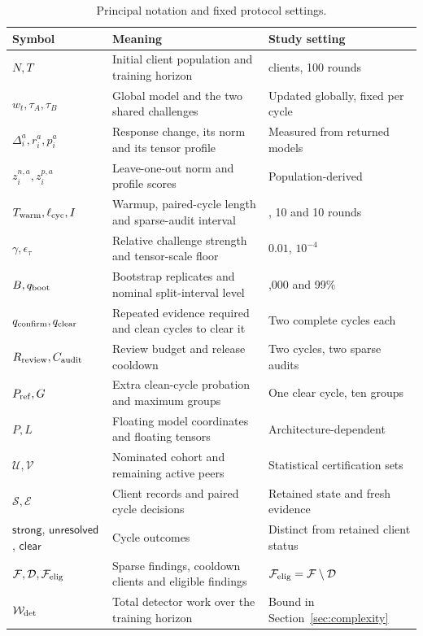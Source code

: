 \begin{table}[t]\centering\footnotesize
\renewcommand{\arraystretch}{1.05}
\caption{Principal notation and fixed protocol settings.}\label{tab:notation-settings}
\begin{tabular}{>{\raggedright\arraybackslash}p{3.1cm}>{\raggedright\arraybackslash}p{8.0cm}>{\raggedright\arraybackslash}p{4.8cm}}\toprule
Symbol & Meaning & Study setting \\ \midrule
$N,T$ & Initial client population and training horizon & 100 clients, 100 rounds \\
$w_t,\tau_A,\tau_B$ & Global model and the two shared challenges & Updated globally, fixed per cycle \\
$\Delta_i^a,r_i^a,p_i^a$ & Response change, its norm and its tensor profile & Measured from returned models \\
$z_i^{n,a},z_i^{p,a}$ & Leave-one-out norm and profile scores & Population-derived \\
$T_{\rm warm},\ell_{\rm cyc},I$ & Warmup, paired-cycle length and sparse-audit interval & 10, 10 and 10 rounds \\
$\gamma,\epsilon_\tau$ & Relative challenge strength and tensor-scale floor & $0.01$, $10^{-4}$ \\
$B,q_{\rm boot}$ & Bootstrap replicates and nominal split-interval level & 1,000 and 99\% \\
$q_{\rm confirm},q_{\rm clear}$ & Repeated evidence required and clean cycles to clear it & Two complete cycles each \\
$R_{\rm review},C_{\rm audit}$ & Review budget and release cooldown & Two cycles, two sparse audits \\
$P_{\rm ref},G$ & Extra clean-cycle probation and maximum groups & One clear cycle, ten groups \\
$P,L$ & Floating model coordinates and floating tensors & Architecture-dependent \\
$\mathcal U,\mathcal V$ & Nominated cohort and remaining active peers & Statistical certification sets \\
$\mathcal S,\mathcal E$ & Client records and paired cycle decisions & Retained state and fresh evidence \\
$\mathsf{strong}$, $\mathsf{unresolved}$, $\mathsf{clear}$ & Cycle outcomes & Distinct from retained client status \\
$\mathcal F,\mathcal D,\mathcal F_{\rm elig}$ & Sparse findings, cooldown clients and eligible findings & $\mathcal F_{\rm elig}=\mathcal F\setminus\mathcal D$ \\
$\mathcal W_{\rm det}$ & Total detector work over the training horizon & Bound in Section~\ref{sec:complexity} \\
\bottomrule\end{tabular}
\end{table}
